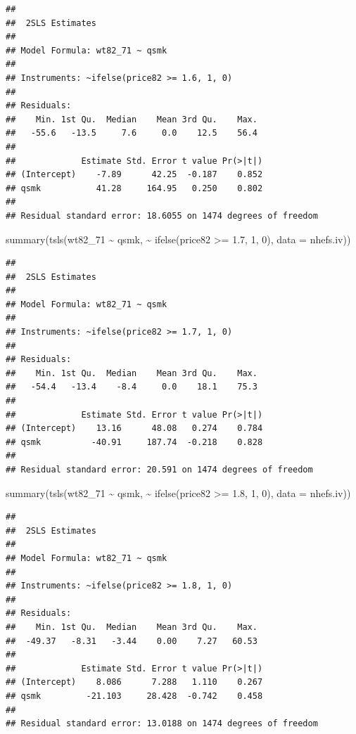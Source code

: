 \documentclass[
  10pt,
]{book}
\newenvironment{Shaded}{\begin{snugshade}}{\end{snugshade}}
\newcommand{\AttributeTok}[1]{\textcolor[rgb]{0.77,0.63,0.00}{#1}}
\newcommand{\DecValTok}[1]{\textcolor[rgb]{0.00,0.00,0.81}{#1}}
\newcommand{\FloatTok}[1]{\textcolor[rgb]{0.00,0.00,0.81}{#1}}
\newcommand{\FunctionTok}[1]{\textcolor[rgb]{0.00,0.00,0.00}{#1}}
\newcommand{\NormalTok}[1]{#1}
\newcommand{\SpecialCharTok}[1]{\textcolor[rgb]{0.00,0.00,0.00}{#1}}
\begin{document}
\begin{verbatim}
## 
##  2SLS Estimates
## 
## Model Formula: wt82_71 ~ qsmk
## 
## Instruments: ~ifelse(price82 >= 1.6, 1, 0)
## 
## Residuals:
##    Min. 1st Qu.  Median    Mean 3rd Qu.    Max. 
##   -55.6   -13.5     7.6     0.0    12.5    56.4 
## 
##             Estimate Std. Error t value Pr(>|t|)
## (Intercept)    -7.89      42.25  -0.187    0.852
## qsmk           41.28     164.95   0.250    0.802
## 
## Residual standard error: 18.6055 on 1474 degrees of freedom
\end{verbatim}

\begin{Shaded}
\begin{Highlighting}[]
\FunctionTok{summary}\NormalTok{(}\FunctionTok{tsls}\NormalTok{(wt82\_71 }\SpecialCharTok{\textasciitilde{}}\NormalTok{ qsmk, }\SpecialCharTok{\textasciitilde{}} \FunctionTok{ifelse}\NormalTok{(price82 }\SpecialCharTok{\textgreater{}=} \FloatTok{1.7}\NormalTok{, }\DecValTok{1}\NormalTok{, }\DecValTok{0}\NormalTok{), }\AttributeTok{data =}\NormalTok{ nhefs.iv))}
\end{Highlighting}
\end{Shaded}

\begin{verbatim}
## 
##  2SLS Estimates
## 
## Model Formula: wt82_71 ~ qsmk
## 
## Instruments: ~ifelse(price82 >= 1.7, 1, 0)
## 
## Residuals:
##    Min. 1st Qu.  Median    Mean 3rd Qu.    Max. 
##   -54.4   -13.4    -8.4     0.0    18.1    75.3 
## 
##             Estimate Std. Error t value Pr(>|t|)
## (Intercept)    13.16      48.08   0.274    0.784
## qsmk          -40.91     187.74  -0.218    0.828
## 
## Residual standard error: 20.591 on 1474 degrees of freedom
\end{verbatim}

\begin{Shaded}
\begin{Highlighting}[]
\FunctionTok{summary}\NormalTok{(}\FunctionTok{tsls}\NormalTok{(wt82\_71 }\SpecialCharTok{\textasciitilde{}}\NormalTok{ qsmk, }\SpecialCharTok{\textasciitilde{}} \FunctionTok{ifelse}\NormalTok{(price82 }\SpecialCharTok{\textgreater{}=} \FloatTok{1.8}\NormalTok{, }\DecValTok{1}\NormalTok{, }\DecValTok{0}\NormalTok{), }\AttributeTok{data =}\NormalTok{ nhefs.iv))}
\end{Highlighting}
\end{Shaded}

\begin{verbatim}
## 
##  2SLS Estimates
## 
## Model Formula: wt82_71 ~ qsmk
## 
## Instruments: ~ifelse(price82 >= 1.8, 1, 0)
## 
## Residuals:
##    Min. 1st Qu.  Median    Mean 3rd Qu.    Max. 
##  -49.37   -8.31   -3.44    0.00    7.27   60.53 
## 
##             Estimate Std. Error t value Pr(>|t|)
## (Intercept)    8.086      7.288   1.110    0.267
## qsmk         -21.103     28.428  -0.742    0.458
## 
## Residual standard error: 13.0188 on 1474 degrees of freedom
\end{verbatim}
\end{document}
